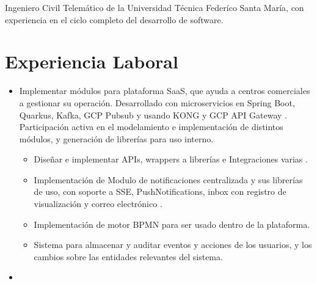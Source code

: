 \documentclass[11pt,letterpaper,sans]{moderncv}        %
\begin{document}
\makecvtitle

\small{Ingeniero Civil Telemático de la Universidad Técnica Federíco Santa María, con experiencia en el ciclo completo del desarrollo de software.}


\section{Experiencia Laboral}

\vspace{4pt}

\begin{itemize}

\item{
{\vspace{3pt}
Implementar módulos para plataforma SaaS, que ayuda a centros comerciales a gestionar su operación. Desarrollado con microservicios en Spring Boot, Quarkus, Kafka, GCP Pubsub y usando KONG y GCP API Gateway . Participación activa en el modelamiento e implementación de distintos módulos, y generación de librerías para uso interno.
\begin{itemize}
\item Diseñar e implementar APIs, wrappers a librerías e Integraciones varias .
\item Implementación de Modulo de notificaciones centralizada y sus librerías de uso, con soporte a SSE, PushNotifications, inbox con registro de visualización y correo electrónico .
\item Implementación de motor BPMN para ser usado dentro de la plataforma.
\item Sistema para almacenar y auditar eventos y acciones de los usuarios, y los cambios sobre las entidades relevantes del sistema.
\end{itemize}
}}

\vspace{6pt}

\item{}


\end{itemize}
\end{document}
